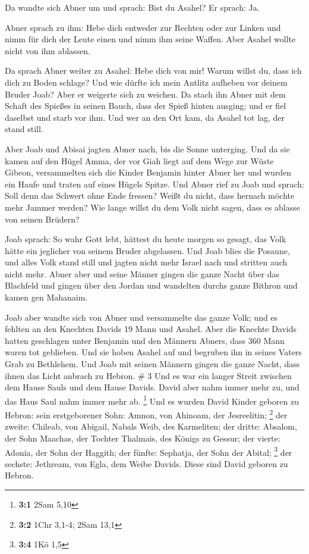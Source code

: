  Da wandte sich Abner um und sprach: Bist du Asahel? Er
sprach: Ja.

 Abner sprach zu ihm: Hebe dich entweder zur Rechten oder
zur Linken und nimm für dich der Leute einen und nimm ihm seine Waffen.
Aber Asahel wollte nicht von ihm ablassen.

 Da sprach Abner weiter zu Asahel: Hebe dich von mir! Warum
willst du, dass ich dich zu Boden schlage? Und wie dürfte ich mein
Antlitz aufheben vor deinem Bruder Joab?  Aber er weigerte
sich zu weichen. Da stach ihn Abner mit dem Schaft des Spießes in seinen
Bauch, dass der Spieß hinten ausging; und er fiel daselbst und starb vor
ihm. Und wer an den Ort kam, da Asahel tot lag, der stand still.

 Aber Joab und Abisai jagten Abner nach, bis die Sonne
unterging. Und da sie kamen auf den Hügel Amma, der vor Giah liegt auf
dem Wege zur Wüste Gibeon,  versammelten sich die Kinder
Benjamin hinter Abner her und wurden ein Haufe und traten auf eines
Hügels Spitze.  Und Abner rief zu Joab und sprach: Soll
denn das Schwert ohne Ende fressen? Weißt du nicht, dass hernach möchte
mehr Jammer werden? Wie lange willst du dem Volk nicht sagen, dass es
ablasse von seinen Brüdern?

 Joab sprach: So wahr Gott lebt, hättest du heute morgen so
gesagt, das Volk hätte ein jeglicher von seinem Bruder abgelassen.
 Und Joab blies die Posaune, und alles Volk stand still und
jagten nicht mehr Israel nach und stritten auch nicht mehr.
 Abner aber und seine Männer gingen die ganze Nacht über
das Blachfeld und gingen über den Jordan und wandelten durchs ganze
Bithron und kamen gen Mahanaim.

 Joab aber wandte sich von Abner und versammelte das ganze
Volk; und es fehlten an den Knechten Davids 19 Mann und Asahel.
 Aber die Knechte Davids hatten geschlagen unter Benjamin
und den Männern Abners, dass 360 Mann waren tot geblieben. 
Und sie hoben Asahel auf und begruben ihn in seines Vaters Grab zu
Bethlehem. Und Joab mit seinen Männern gingen die ganze Nacht, dass
ihnen das Licht anbrach zu Hebron. \# 3  Und es war ein
langer Streit zwischen dem Hause Sauls und dem Hause Davids. David aber
nahm immer mehr zu, und das Haus Saul nahm immer mehr ab. \footnote{\textbf{3:1}
  2Sam 5,10}  Und es wurden David Kinder geboren zu Hebron:
sein erstgeborener Sohn: Amnon, von Ahinoam, der Jesreelitin;
\footnote{\textbf{3:2} 1Chr 3,1-4; 2Sam 13,1}  der zweite:
Chileab, von Abigail, Nabals Weib, des Karmeliten; der dritte: Absalom,
der Sohn Maachas, der Tochter Thalmais, des Königs zu Gessur;
 der vierte: Adonia, der Sohn der Haggith; der fünfte:
Sephatja, der Sohn der Abital; \footnote{\textbf{3:4} 1Kö 1,5}
 der sechste: Jethream, von Egla, dem Weibe Davids. Diese
sind David geboren zu Hebron.

